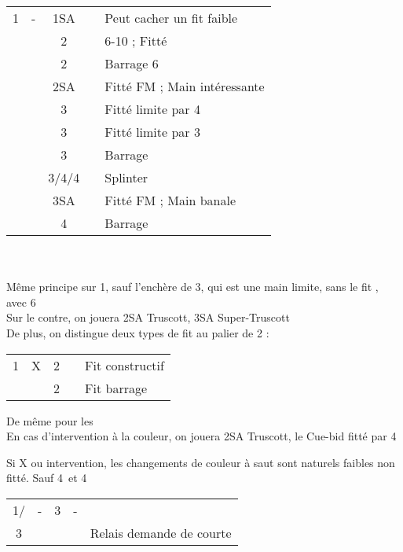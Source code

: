\documentclass[a4paper, oneside, 11pt]{report}
\begin{document}
	\begin{tabular}{cccc|l}
	1\coeur & - & 1SA && Peut cacher un fit faible\\
	&& 2\coeur && 6-10 ; Fitté\\
	&& 2\pique && Barrage 6\pique\\
	&& 2SA && Fitté FM ; Main intéressante\\
	&& 3\trefle && Fitté limite par 4\\
	&& 3\carreau && Fitté limite par 3\\
	&& 3\coeur && Barrage\\
	&& 3\pique/4\trefle/4\carreau && Splinter\\
	&& 3SA && Fitté FM ; Main banale\\
	&& 4\coeur && Barrage\\
	\end{tabular}\\\\

	Même principe sur 1\pique, sauf l'enchère de 3\coeur, qui est une main limite, sans le fit \pique, avec 6\coeur\\

		Sur le contre, on jouera 2SA Truscott, 3SA Super-Truscott\\
		De plus, on distingue deux types de fit au palier de 2 :

		\begin{tabular}{cccc|l}
		1\coeur & X & 2\carreau && Fit constructif\\
		&& 2\coeur && Fit barrage\\
		\end{tabular}
		
		De même pour les \pique\\

		En cas d'intervention à la couleur, on jouera 2SA Truscott, le Cue-bid fitté par 4
		
		Si X ou intervention, les changements de couleur à saut sont naturels faibles non fitté. Sauf 4\trefle\ et 4\carreau\\

		\begin{tabular}{cccc|l}
		1\coeur/\pique & - & 3\trefle & - &\\
		3\carreau &&&& Relais demande de courte\\
		\end{tabular}\\\\
		
\end{document}
